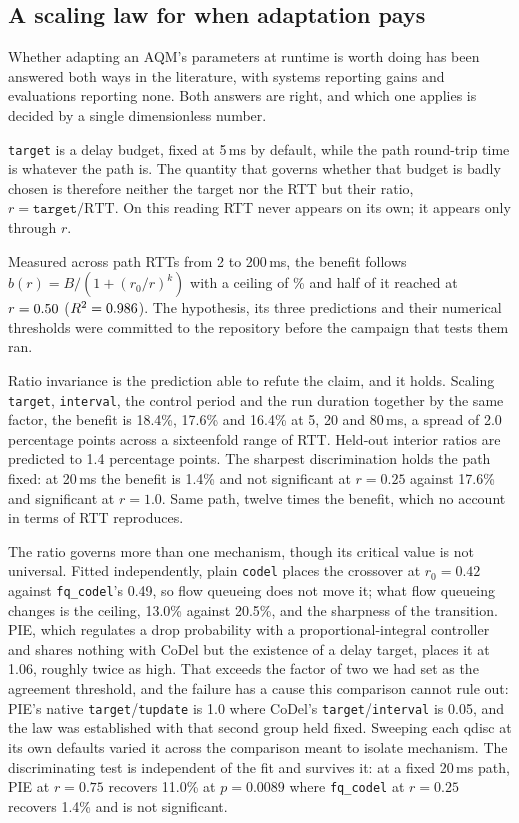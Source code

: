 \subsection*{A scaling law for when adaptation pays}

Whether adapting an AQM's parameters at runtime is worth doing has been
answered both ways in the literature, with systems reporting gains and
evaluations reporting none. Both answers are right, and which one applies is
decided by a single dimensionless number.

\texttt{target} is a delay budget, fixed at 5\,ms by default, while the path
round-trip time is whatever the path is. The quantity that governs whether
that budget is badly chosen is therefore neither the target nor the RTT but
their ratio, $r = \texttt{target}/\text{RTT}$. On this reading RTT never
appears on its own; it appears only through $r$.

Measured across path RTTs from 2 to 200\,ms, the benefit follows
$b(r) = B/(1 + (r_0/r)^k)$ with a ceiling of \LawCeiling\% and half of it
reached at $r = 0.50$ ($R^2 = 0.986$). The hypothesis, its three
predictions and their numerical thresholds were committed to the repository
before the campaign that tests them ran.

Ratio invariance is the prediction able to refute the claim, and it holds.
Scaling \texttt{target}, \texttt{interval}, the control period and the run
duration together by the same factor, the benefit is 18.4\%, 17.6\% and 16.4\%
at 5, 20 and 80\,ms, a spread of 2.0 percentage points across a sixteenfold
range of RTT. Held-out interior ratios are predicted to 1.4 percentage points.
The sharpest discrimination holds the path fixed: at 20\,ms the benefit is
1.4\% and not significant at $r = 0.25$ against 17.6\% and significant at
$r = 1.0$. Same path, twelve times the benefit, which no account in terms of
RTT reproduces.

The ratio governs more than one mechanism, though its critical value is not
universal. Fitted independently, plain \texttt{codel} places the crossover at
$r_0 = 0.42$ against \texttt{fq\_codel}'s 0.49, so flow queueing does not move
it; what flow queueing changes is the ceiling, 13.0\% against 20.5\%, and the
sharpness of the transition. PIE, which regulates a drop probability with a
proportional-integral controller and shares nothing with CoDel but the
existence of a delay target, places it at 1.06, roughly twice as high. That
exceeds the factor of two we had set as the agreement threshold, and the
failure has a cause this comparison cannot rule out: PIE's native
\texttt{target}/\texttt{tupdate} is 1.0 where CoDel's
\texttt{target}/\texttt{interval} is 0.05, and the law was established with
that second group held fixed. Sweeping each qdisc at its own defaults varied
it across the comparison meant to isolate mechanism. The discriminating test
is independent of the fit and survives it: at a fixed 20\,ms path, PIE at
$r = 0.75$ recovers 11.0\% at $p = 0.0089$ where \texttt{fq\_codel} at
$r = 0.25$ recovers 1.4\% and is not significant.

